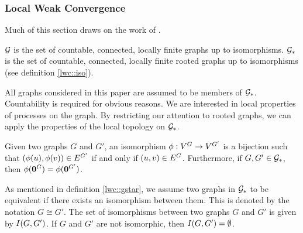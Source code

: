 \subsubsection{Local Weak Convergence}
\label{g::lwc}

Much of this section draws on the work of \cite{LacRamWu19}.

\begin{defn}
\(\mathcal{G}\) is the set of countable, connected, locally finite graphs up to isomorphisms. \(\mathcal{G}_\ast\) is the set of countable, connected, locally finite rooted graphs up to isomorphisms (see definition \ref{lwc::iso}).
\label{lwc::gstar}
\end{defn}

All graphs considered in this paper are assumed to be members of \(\mathcal{G}_\ast\). Countability is required for obvious reasons. We are interested in local properties of processes on the graph. By restricting our attention to rooted graphs, we can apply the properties of the local topology on \(\mathcal{G}_\ast\). 

\ind {}

\begin{defn}
Given two graphs \(G\) and \(G'\), an isomorphism \(\phi:V^{G}\rightarrow V^{G'}\) is a bijection such that \((\phi(u),\phi(v)) \in E^{G'}\) if and only if \((u,v) \in E^{G}\). Furthermore, if \(G,G'\in \mathcal{G}_\ast\), then \(\phi(\mathbf{0}^{G}) = \phi(\mathbf{0}^{G'})\).
\label{lwc::iso}
\end{defn}

As mentioned in definition \ref{lwc::gstar}, we assume two graphs in \(\mathcal{G}_\ast\) to be equivalent if there exists an isomorphism between them. This is denoted by the notation \(G \cong G'\). The set of isomorphisms between two graphs \(G\) and \(G'\) is given by \(I(G,G')\). If \(G\) and \(G'\) are not isomorphic, then \(I(G,G') = \emptyset\).

